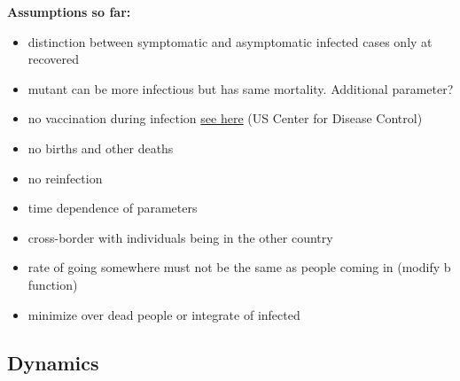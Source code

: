 \textbf{Assumptions so far:} 
\begin{itemize}
    \item distinction between symptomatic and asymptomatic infected cases only at recovered
    \item mutant can be more infectious but has same mortality. Additional parameter?
    \item no vaccination during infection \href{https://www.cdc.gov/vaccines/covid-19/info-by-product/clinical-considerations.html}{see here} (US Center for Disease Control)
    \item no births and other deaths
    \item no reinfection
\end{itemize}
\vspace{0.5cm}

\begin{itemize}
\item time dependence of parameters
\item cross-border with individuals being in the other country
\item rate of going somewhere must not be the same as people coming in (modify b function)
\item minimize over dead people or integrate of infected
\end{itemize}




\subsection{Dynamics}

 
